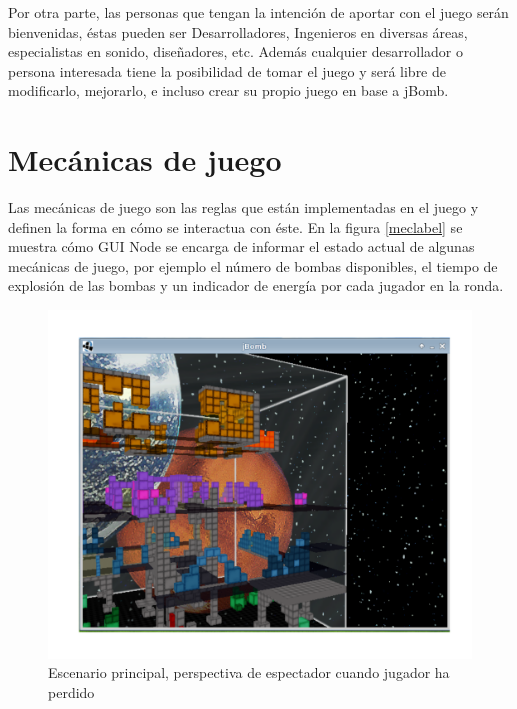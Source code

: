 \documentclass[a4paper,12pt,openany,oneside]{book}
\begin{document}
Por otra parte, las personas que tengan la intención de aportar con el juego serán bienvenidas,  éstas pueden ser Desarrolladores, Ingenieros en diversas áreas, especialistas en sonido, diseñadores, etc. Además cualquier desarrollador o persona interesada tiene la posibilidad de tomar el juego y será libre de modificarlo, mejorarlo, e incluso crear su propio juego en base a jBomb.
\section{Mecánicas de juego}
Las mecánicas de juego son las reglas que están implementadas en el juego y definen la forma en cómo se interactua con éste. En la figura \ref{meclabel} se muestra cómo GUI Node se encarga de informar el estado actual de algunas mecánicas de juego, por ejemplo el número de bombas disponibles, el tiempo de explosión de las bombas y un indicador de energía por cada jugador en la ronda.

\begin{figure}
\begin{center}
\includegraphics[scale=.7]{img4.pdf}
\end{center}
\caption[Escenario principal, perspectiva de espectador]{Escenario principal, perspectiva de espectador cuando jugador ha perdido}
\end{figure}
\end{document}
